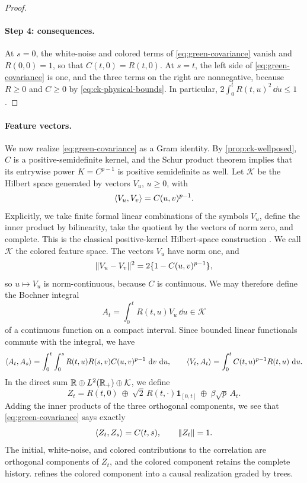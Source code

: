 \begin{proof}
\paragraph{Step 4: consequences.}
At $s=0$, the white-noise and colored terms of \eqref{eq:green-covariance} vanish and $R(0,0)=1$, so that $C(t,0)=R(t,0)$. At $s=t$, the left side of \eqref{eq:green-covariance} is one, and the three terms on the right are nonnegative, because $R\ge0$ and $C\ge0$ by \eqref{eq:ck-physical-bounds}. In particular, $2\int_0^tR(t,u)^2\,\dd u\le1$.
\end{proof}

\paragraph{Feature vectors.}
We now realize \eqref{eq:green-covariance} as a Gram identity. By \cref{prop:ck-wellposed}, $C$ is a positive-semidefinite kernel, and the Schur product theorem \cite[Section~4, Satz~VII, p.~14]{schur1911} implies that its entrywise power $K=C^{p-1}$ is positive semidefinite as well. Let $\mathcal K$ be the Hilbert space generated by vectors $V_u$, $u\ge0$, with
\[
 \left\langle V_u,V_v\right\rangle=C(u,v)^{p-1}.
\]
Explicitly, we take finite formal linear combinations of the symbols $V_u$, define the inner product by bilinearity, take the quotient by the vectors of norm zero, and complete. This is the classical positive-kernel Hilbert-space construction \cite[Part~I, Section~2(4), p.~344]{aronszajn1950}. We call $\mathcal K$ the colored feature space. The vectors $V_u$ have norm one, and
\begin{equation}
\lVert V_u-V_v\rVert^2=2\{1-C(u,v)^{p-1}\},
\label{eq:colored-feature-modulus}
\end{equation}
so $u\mapsto V_u$ is norm-continuous, because $C$ is continuous. We may therefore define the Bochner integral
\[
 A_t=\int_0^tR(t,u)V_u\,\dd u\in\mathcal K
\]
of a continuous function on a compact interval. Since bounded linear functionals commute with the integral, we have
\[
 \left\langle A_t,A_s\right\rangle=\int_0^t\int_0^sR(t,u)R(s,v)C(u,v)^{p-1}\,\mathop{}\!\mathrm d v\,\mathop{}\!\mathrm d u,\qquad
 \left\langle V_t,A_t\right\rangle=\int_0^tC(t,u)^{p-1}R(t,u)\,\mathop{}\!\mathrm d u.
\]
In the direct sum $\mathbb R\oplus L^2(\mathbb R_+)\oplus\mathcal K$, we define
\begin{equation}\label{eq:full-feature}
Z_t=R(t,0)\ \oplus\ \sqrt2\,R(t,\cdot)\mathbf 1_{[0,t]}\ \oplus\ \beta\sqrt p\,A_t.
\end{equation}
Adding the inner products of the three orthogonal components, we see that \eqref{eq:green-covariance} says exactly
\[
 \left\langle Z_t,Z_s\right\rangle=C(t,s),\qquad \lVert Z_t\rVert=1.
\]
The initial, white-noise, and colored contributions to the correlation are orthogonal components of $Z_t$, and the colored component retains the complete history.  refines the colored component into a causal realization graded by trees.

